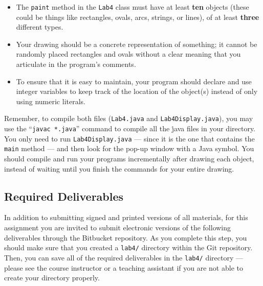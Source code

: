 \begin{itemize}

  \item The {\tt paint} method in the {\tt Lab4} class must have at least \textbf{ten} objects (these could be things
    like rectangles, ovals, arcs, strings, or lines), of at least \textbf{three} different types.

  \item Your drawing should be a concrete representation of something; it cannot be randomly placed rectangles and
    ovals without a clear meaning that you articulate in the program's comments.

  \item To ensure that it is easy to maintain, your program should declare and use integer variables to keep track of
    the location of the object(s) instead of only using numeric literals.

\end{itemize}

\begin{sloppypar}
Remember, to compile both files ({\tt Lab4.java} and {\tt Lab4Display.java}), you may use the ``{\tt javac *.java}''
command to compile all the {\.java} files in your directory. You only need to run {\tt Lab4Display.java} --- since it is
the one that contains the {\tt main} method --- and then look for the pop-up window with a Java symbol. You should
compile and run your programs incrementally after drawing each object, instead of waiting until you finish the commands
for your entire drawing.
\end{sloppypar}

\vspace*{-.1in}
\subsection*{Required Deliverables}

In addition to submitting signed and printed versions of all materials, for this assignment you are invited to submit
electronic versions of the following deliverables through the Bitbucket repository. As you complete this step, you
should make sure that you created a {\tt lab4/} directory within the Git repository.  Then, you can save all of the
required deliverables in the {\tt lab4/} directory --- please see the course instructor or a teaching assistant if you are
not able to create your directory properly.

